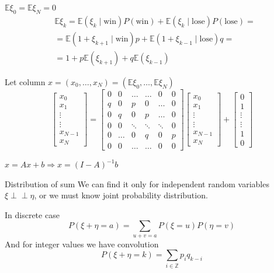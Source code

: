 \documentclass[fullscreen=true, bookmarks=true, hyperref={pdfencoding=unicode}]{beamer}
\newcommand{\indep}{\perp \!\!\! \perp}
\begin{document}
\begin{frame}
  $\mathbb{E}\xi_0 = \mathbb{E}\xi_N = 0$
  \begin{align*}
    &\mathbb{E}\xi_k = \mathbb{E}(\xi_k \mid \text{win})P(\text{win}) + 
    \mathbb{E}(\xi_k \mid \text{lose})P(\text{lose}) = \\
    &= \mathbb{E}(1 + \xi_{k+1} \mid \text{win})p + 
    \mathbb{E}(1 + \xi_{k-1} \mid \text{lose})q = \\
    &= 1 + p\mathbb{E}(\xi_{k+1}) + q\mathbb{E}(\xi_{k-1})
  \end{align*}

  \pause
  Let column $x = (x_0, \dots, x_N) = (\mathbb{E}\xi_0, \dots, \mathbb{E}\xi_N)$
  \[
    \begin{bmatrix}
    x_0 \\ x_1 \\ \vdots \\ \vdots \\ x_{N-1}\\ x_N
    \end{bmatrix} =
    \begin{bmatrix}
    0 & 0 & \dots & \dots & 0 & 0 \\
    q & 0 & p & 0 & \dots & 0 \\
    0 & q & 0 & p & \dots & 0 \\
    0 & 0 & \ddots & \ddots & \ddots & 0 \\
    0 & \dots & 0 & q & 0 & p \\
    0 & 0 & \dots & \dots & 0 & 0 
  \end{bmatrix} 
  \begin{bmatrix}
    x_0 \\ x_1 \\ \vdots \\ \vdots \\ x_{N-1}\\ x_N    
  \end{bmatrix} +
  \begin{bmatrix}
    0 \\ 1 \\ \vdots \\ \vdots \\ 1\\ 0
  \end{bmatrix} 
  \]

  \pause
  $x = Ax + b \Rightarrow \boxed{x = (I - A)^{-1} b}$
\end{frame}


\begin{frame}{Distribution of sum}
  We can find it only for independent random variables $\xi \indep \eta$, 
  or we must know joint probability distribution.

  \pause
  In discrete case
  $$ P(\xi + \eta = a) = \sum\limits_{u+v = a} P(\xi = u) P(\eta = v) $$
  And for integer values we have convolution
  $$ P(\xi + \eta = k) = \sum\limits_{i \in \mathbb{Z}} p_i q_{k-i}$$
\end{frame}
\end{document}
